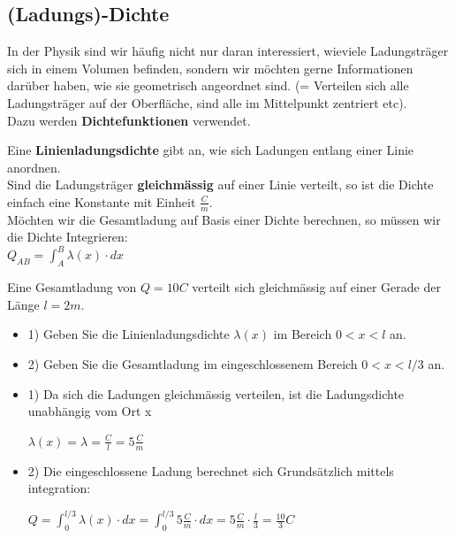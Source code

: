 \subsection{(Ladungs)-Dichte}
In der Physik sind wir häufig nicht nur daran interessiert, wieviele Ladungsträger sich in einem Volumen befinden, sondern wir möchten gerne Informationen darüber haben, wie sie geometrisch angeordnet sind. (= Verteilen sich alle Ladungsträger auf der Oberfläche, sind alle im Mittelpunkt zentriert etc). \\
Dazu werden \textbf{Dichtefunktionen} verwendet.

\beginip
Eine \textbf{Linienladungsdichte} gibt an, wie sich Ladungen entlang einer Linie anordnen. \\
Sind die Ladungsträger \textbf{gleichmässig} auf einer Linie verteilt, so ist die Dichte einfach eine Konstante mit Einheit $\frac{C}{m}$. \\
Möchten wir die Gesamtladung auf Basis einer Dichte berechnen, so müssen wir die Dichte Integrieren: \\
\formulaBegin
	$\displaystyle Q_{AB} = \int_A^B \lambda (x) \cdot dx$
\formulaEnd
\iend

\beginbsp
	Eine Gesamtladung von $Q=10C$ verteilt sich gleichmässig auf einer Gerade der Länge $l = 2m$. \\
	\begin{itemize}
		\item 1) Geben Sie die Linienladungsdichte $\lambda(x)$ im Bereich $ 0 < x <l$ an.
		\item 2) Geben Sie die Gesamtladung im eingeschlossenem Bereich $ 0 < x < l/3$ an.
	\end{itemize}
\iend

\newpage
{}
\beginbsp
\begin{itemize}
	\item 1) Da sich die Ladungen gleichmässig verteilen, ist die Ladungsdichte unabhängig vom Ort x
	\begin{center}
		$\lambda(x) = \lambda = \frac{C}{l} = 5 \frac{C}{m}$
	\end{center}
	\item 2) Die eingeschlossene Ladung berechnet sich Grundsätzlich mittels integration:
	\begin{center}
		$\displaystyle Q = \int_0^{l/3} \lambda(x) \cdot dx = \int_0^{l/3} 5 \frac{C}{m} \cdot dx = 5 \frac{C}{m} \cdot \frac{l}{3} = \frac{10}{3} C$
	\end{center}
\end{itemize}
\iend









